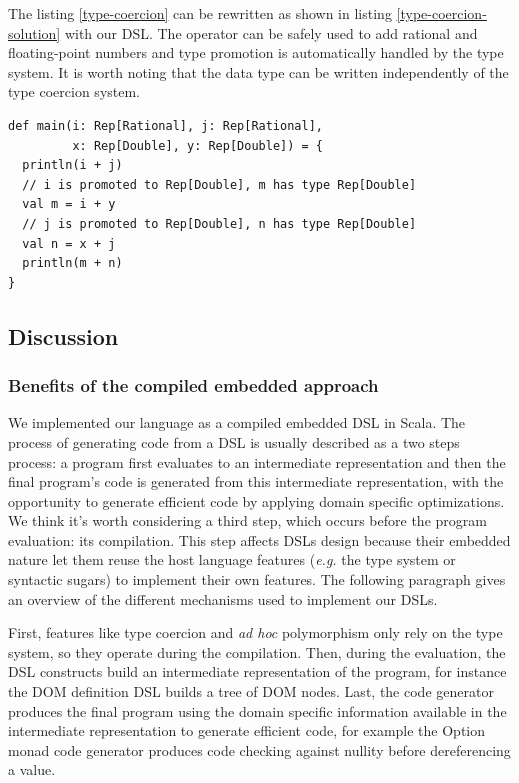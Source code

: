 \documentclass[american,english,runningheads]{llncs}
\newcommand{\eg}{\emph{e.g.}}
\begin{document}
The listing \ref{type-coercion} can be rewritten as shown in listing \ref{type-coercion-solution} with our DSL.
The \code{+} operator can be safely used to add rational and floating-point numbers and type promotion is
automatically handled by the type system. It is worth noting that the  data type can be written
independently of the type coercion system.

\begin{lstlisting}[label=type-coercion-solution,caption=Type-coercion automatically handled by our DSL]
def main(i: Rep[Rational], j: Rep[Rational],
         x: Rep[Double], y: Rep[Double]) = {
  println(i + j)
  // i is promoted to Rep[Double], m has type Rep[Double]
  val m = i + y
  // j is promoted to Rep[Double], n has type Rep[Double]
  val n = x + j
  println(m + n)
}
\end{lstlisting}

\subsection{Discussion}

\subsubsection{Benefits of the compiled embedded approach}

We implemented our language as a compiled embedded DSL in Scala. The process of generating code from a DSL is usually
described as a two steps process: a program first evaluates to an intermediate representation and then the final
program’s code is generated from this intermediate representation, with the opportunity to generate efficient code
by applying domain specific optimizations. We think it’s worth considering a third step, which occurs before the
program evaluation: its compilation. This step affects DSLs design because their embedded nature let them reuse the
host language features (\eg{} the type system or syntactic sugars) to implement their own features. The following
paragraph gives an overview of the different mechanisms used to implement our DSLs.

First, features like type coercion and \emph{ad hoc} polymorphism only rely on the type system, so they operate during
the compilation. Then, during the evaluation, the DSL constructs build an intermediate representation of the program,
for instance the DOM definition DSL builds a tree of DOM nodes. Last, the code generator produces the final program
using the domain specific information available in the intermediate representation to generate efficient code, for
example the Option monad code generator produces code checking against nullity before dereferencing a value.
\end{document}
